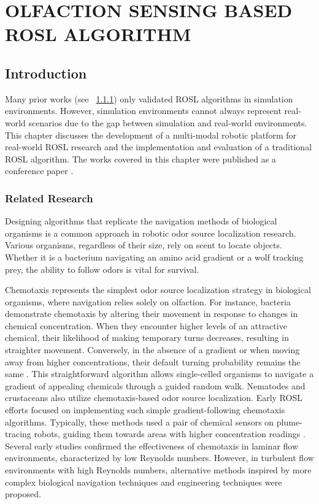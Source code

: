 \chapter{OLFACTION SENSING BASED ROSL ALGORITHM}\label{chap:olfaction}

\section{Introduction}
Many prior works (see ~\ref{Subsec:olfactionRelatedResearch}) only validated ROSL algorithms in simulation environments. However, simulation environments cannot always represent real-world scenarios due to the gap between simulation and real-world environments. 
This chapter discusses the development of a multi-modal robotic platform for real-world ROSL research and the implementation and evaluation of a traditional ROSL algorithm. The works covered in this chapter were published as a conference paper \cite{hassan2023multi}.

\subsection{Related Research}\label{Subsec:olfactionRelatedResearch}
Designing algorithms that replicate the navigation methods of biological organisms is a common approach in robotic odor source localization research. Various organisms, regardless of their size, rely on scent to locate objects. Whether it is a bacterium navigating an amino acid gradient or a wolf tracking prey, the ability to follow odors is vital for survival.

Chemotaxis represents the simplest odor source localization strategy in biological organisms, where navigation relies solely on olfaction. For instance, bacteria demonstrate chemotaxis by altering their movement in response to changes in chemical concentration. When they encounter higher levels of an attractive chemical, their likelihood of making temporary turns decreases, resulting in straighter movement. Conversely, in the absence of a gradient or when moving away from higher concentrations, their default turning probability remains the same \cite{berg2000motile}. This straightforward algorithm allows single-celled organisms to navigate a gradient of appealing chemicals through a guided random walk. Nematodes \cite{lockery2011computational} and crustaceans \cite{radvansky2018olfactory} also utilize chemotaxis-based odor source localization. Early ROSL efforts focused on implementing such simple gradient-following chemotaxis algorithms. Typically, these methods used a pair of chemical sensors on plume-tracing robots, guiding them towards areas with higher concentration readings \cite{sandini1993gradient}. Several early studies \cite{grasso2000biomimetic, russell2003comparison, lilienthal2004experimental, ishida2005controlling} confirmed the effectiveness of chemotaxis in laminar flow environments, characterized by low Reynolds numbers. However, in turbulent flow environments with high Reynolds numbers, alternative methods inspired by more complex biological navigation techniques and engineering techniques were proposed.

